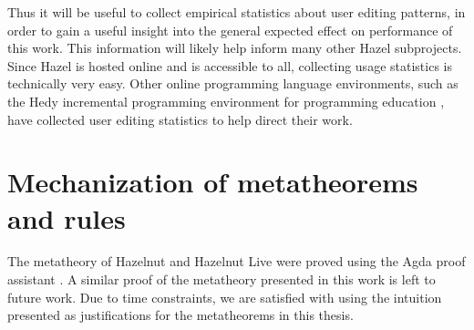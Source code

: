 Thus it will be useful to collect empirical statistics about user editing patterns, in order to gain a useful insight into the general expected effect on performance of this work. This information will likely help inform many other Hazel subprojects. Since Hazel is hosted online and is accessible to all, collecting usage statistics is technically very easy. Other online programming language environments, such as the Hedy incremental programming environment for programming education \cite{hermans2020hedy,gilsing2021gradual}, have collected user editing statistics to help direct their work.

\section{Mechanization of metatheorems and rules}
\label{sec:formalization}

The metatheory of Hazelnut and Hazelnut Live were proved using the Agda proof assistant \cite{agda2017,agda-dynamics}. A similar proof of the metatheory presented in this work is left to future work. Due to time constraints, we are satisfied with using the intuition presented as justifications for the metatheorems in this thesis.

